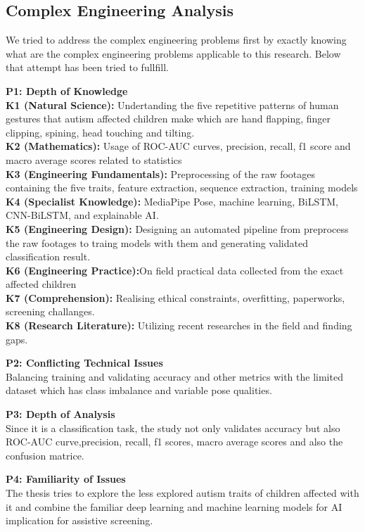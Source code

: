 \subsection{Complex Engineering Analysis}

We tried to address the complex engineering problems first by exactly knowing what are the complex engineering problems applicable to this research. Below that attempt has been tried to fullfill.

\textbf{P1: Depth of Knowledge} \\
\textbf{K1 (Natural Science):} Undertanding the five repetitive patterns of human gestures that autism affected children make which are hand flapping, finger clipping, spining, head touching and tilting. \\
\textbf{K2 (Mathematics):} Usage of ROC-AUC curves, precision, recall, f1 score and macro average scores related to statistics  \\
\textbf{K3 (Engineering Fundamentals):} Preprocessing of the raw footages containing the five traits, feature extraction, sequence extraction, training models\\
\textbf{K4 (Specialist Knowledge):} MediaPipe Pose, machine learning, BiLSTM, CNN-BiLSTM, and explainable AI. \\
\textbf{K5 (Engineering Design):} Designing an automated pipeline from preprocess the raw footages to traing models with them and generating validated classification result.\\
\textbf{K6 (Engineering Practice):}On field practical data collected from the exact affected children \\
\textbf{K7 (Comprehension):} Realising ethical constraints, overfitting, paperworks, screening challanges. \\
\textbf{K8 (Research Literature):} Utilizing recent researches in the field and finding gaps.

\textbf{P2: Conflicting Technical Issues} \\
Balancing training and validating accuracy and other metrics with the limited dataset which has class imbalance and variable pose qualities.

\textbf{P3: Depth of Analysis} \\
Since it is a classification task, the study not only validates accuracy but also ROC-AUC curve,precision, recall, f1 scores, macro average scores and also the confusion matrice.

\textbf{P4: Familiarity of Issues} \\
The thesis tries to explore the less explored autism traits of children affected with it and combine the familiar deep learning and machine learning models for AI implication for assistive screening.

